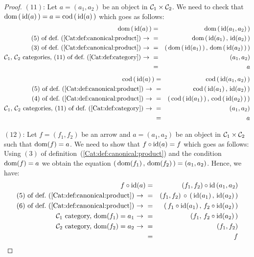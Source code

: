 \begin{proof}
    $(11)$: Let $a=(a_{1},a_{2})$ be an object in $\mbox{${\cal C}_{1}$}\times\mbox{${\cal C}_{2}$}$. We need
    to check that $\mbox{\rm dom}\,(\,\mbox{\rm id}(a)\,)=a=\mbox{\rm cod}\,(\,\mbox{\rm id}(a)\,)$ which goes as
    follows:
        \begin{eqnarray*}\dom\,(\,\id(a)\,)
            &=&\dom\,(\,\id(a_{1},a_{2})\,)\\
            \mbox{$(5)$ of def.~(\ref{Cat:def:canonical:product})\ $\to$\ }
            &=&\dom\,(\,\id(a_{1})\,,\,\id(a_{2})\,)\\
            \mbox{$(3)$ of def.~(\ref{Cat:def:canonical:product})\ $\to$\ }
            &=&(\,\dom\,(\,\id(a_{1})\,)\,,\,\dom\,(\,\id(a_{2})\,)\,)\\
            \mbox{\Cone,\ \Ctwo\ categories, 
                $(11)$ of def.~(\ref{Cat:def:category})\ $\to$\ }
            &=&(a_{1},a_{2})\\
            &=&a
        \end{eqnarray*}
        \begin{eqnarray*}\cod\,(\,\id(a)\,)
            &=&\cod\,(\,\id(a_{1},a_{2})\,)\\
            \mbox{$(5)$ of def.~(\ref{Cat:def:canonical:product})\ $\to$\ }
            &=&\cod\,(\,\id(a_{1})\,,\,\id(a_{2})\,)\\
            \mbox{$(4)$ of def.~(\ref{Cat:def:canonical:product})\ $\to$\ }
            &=&(\,\cod\,(\,\id(a_{1})\,)\,,\,\cod\,(\,\id(a_{2})\,)\,)\\
            \mbox{\Cone,\ \Ctwo\ categories, 
                $(11)$ of def.~(\ref{Cat:def:category})\ $\to$\ }
            &=&(a_{1},a_{2})\\
            &=&a
        \end{eqnarray*}

    $(12)$: Let $f=(f_{1},f_{2})$ be an arrow and $a=(a_{1},a_{2})$ be an 
    object in $\mbox{${\cal C}_{1}$}\times\mbox{${\cal C}_{2}$}$ such that $\mbox{\rm dom}(f)=a$. We need to show that
    $f\circ\mbox{\rm id}(a)=f$ which goes as follows: Using $(3)$ of 
    definition~(\ref{Cat:def:canonical:product}) and the condition $\mbox{\rm dom}(f)=a$ 
    we obtain the equation $(\,\mbox{\rm dom}(f_{1})\,,\,\mbox{\rm dom}(f_{2})\,)=(a_{1},a_{2})$.
    Hence, we have:
        \begin{eqnarray*}f\circ\id(a)
            &=&(f_{1},f_{2})\circ\id\,(a_{1},a_{2})\\
            \mbox{$(5)$ of def.~(\ref{Cat:def:canonical:product})\ $\to$\ }
            &=&(f_{1},f_{2})\,\circ\,(\,\id(a_{1})\,,\,\id(a_{2})\,)\\
            \mbox{$(6)$ of def.~(\ref{Cat:def:canonical:product})\ $\to$\ }
            &=&(\,f_{1}\circ\id(a_{1})\,,\,f_{2}\circ\id(a_{2})\,)\\
            \mbox{\Cone\ category, $\dom(f_{1})=a_{1}$\ $\to$\ }
            &=&(f_{1},\,f_{2}\circ\id(a_{2})\,)\\
            \mbox{\Ctwo\ category, $\dom(f_{2})=a_{2}$\ $\to$\ }
            &=&(f_{1},f_{2})\\
            &=&f
        \end{eqnarray*}


\end{proof}
